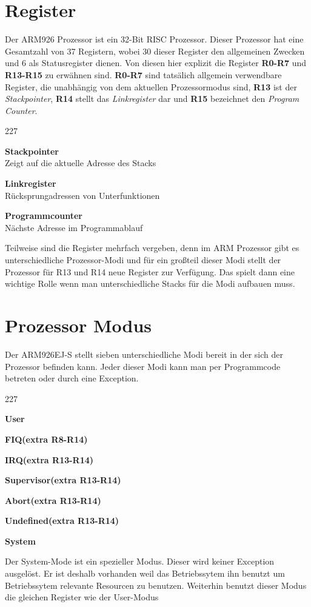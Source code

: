 \section{Register}
Der ARM926 Prozessor ist ein 32-Bit RISC Prozessor. Dieser Prozessor hat eine Gesamtzahl von 37 Registern\parencite[vgl.][44\psqq]{archManI}, wobei 30 dieser Register den allgemeinen Zwecken und 6 als Statusregister dienen. Von diesen hier explizit die Register \textbf{R0-R7} und \textbf{R13-R15} zu erw\"ahnen sind. \textbf{R0-R7} sind tats\"alich allgemein verwendbare Register, die unabh\"angig von dem aktuellen Prozessormodus sind, \textbf{R13} ist der \textit{Stackpointer}, \textbf{R14} stellt das \textit{Linkregister} dar und \textbf{R15} bezeichnet den \textit{Program Counter}.
\begin{dinglist}{227}
	\item{\textbf{Stackpointer}}\\
	Zeigt auf die aktuelle Adresse des Stacks
	\item{\textbf{Linkregister}}\\
	R\"ucksprungadressen von Unterfunktionen
	\item{\textbf{Programmcounter}}\\
	N\"achste Adresse im Programmablauf
\end{dinglist}
Teilweise sind die Register mehrfach vergeben, denn im ARM Prozessor gibt es unterschiedliche Prozessor-Modi und f\"ur ein gro\ss teil dieser Modi stellt der Prozessor f\"ur R13 und R14 neue Register zur Verf\"ugung. Das spielt dann eine wichtige Rolle wenn man unterschiedliche Stacks f\"ur die Modi aufbauen muss.
\section{Prozessor Modus}
Der ARM926EJ-S stellt sieben unterschiedliche Modi bereit in der sich der Prozessor befinden kann. Jeder dieser Modi kann man per Programmcode betreten oder durch eine Exception. 
\begin{dinglist}{227}
	\item{\textbf{User}}
	\item{\textbf{FIQ(extra R8-R14) }}
	\item{\textbf{IRQ(extra R13-R14)}}
	\item{\textbf{Supervisor(extra R13-R14)}}
	\item{\textbf{Abort(extra R13-R14)}}
	\item{\textbf{Undefined(extra R13-R14)}}
	\item{\textbf{System}}
\end{dinglist}
Der System-Mode ist ein spezieller Modus. Dieser wird keiner Exception ausgel\"ost. Er ist deshalb vorhanden weil das Betriebssytem ihn benutzt um Betriebssytem relevante Resourcen zu benutzen. Weiterhin benutzt dieser Modus die gleichen Register wie der User-Modus

